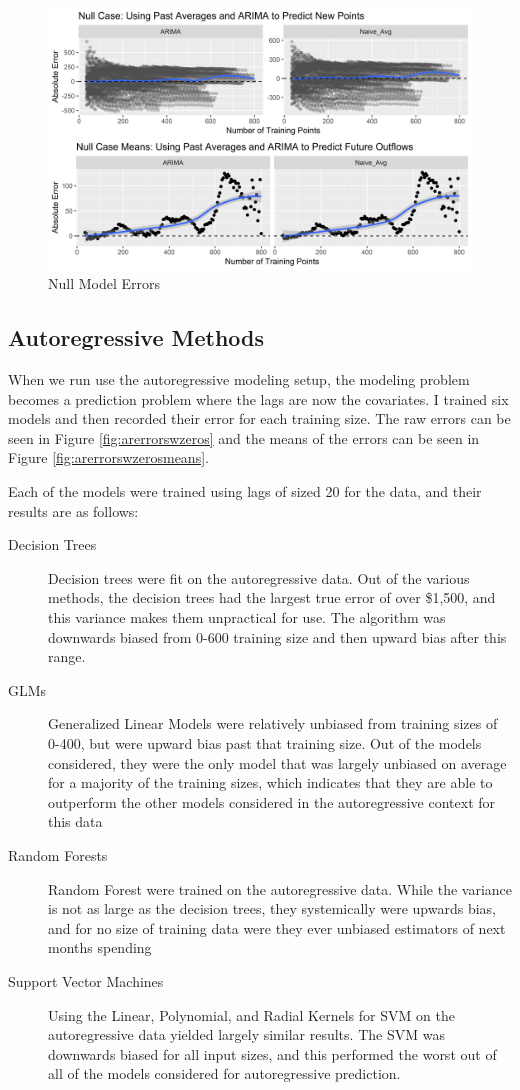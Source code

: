 \documentclass[11pt,a4paper]{article}
\begin{document}
\begin{figure}
	\centering
	\includegraphics[width=1\linewidth]{../figures/08_null_errors}
	\caption{Null Model Errors}
	\label{fig:08nullerrors}
\end{figure}
	
\subsection{Autoregressive Methods}

When we run use the autoregressive modeling setup, the modeling problem becomes a prediction problem where the lags are now the covariates. I trained six models and then recorded their error for each training size. The raw errors can be seen in Figure \ref{fig:arerrorswzeros} and the means of the errors can be seen in Figure \ref{fig:arerrorswzerosmeans}.

Each of the models were trained using lags of sized 20 for the data, and their results are as follows:
\begin{description}
	\item[Decision Trees] Decision trees were fit on the autoregressive data. Out of the various methods, the decision trees had the largest true error of over \$1,500, and this variance makes them unpractical for use. The algorithm was downwards biased from 0-600 training size and then upward bias after this range. 
	\item[GLMs] Generalized Linear Models were relatively unbiased from training sizes of 0-400, but were upward bias past that training size. Out of the models considered, they were the only model that was largely unbiased on average for a majority of the training sizes, which indicates that they are able to outperform the other models considered in the autoregressive context for this data
	\item[Random Forests] Random Forest were trained on the autoregressive data. While the variance is not as large as the decision trees, they systemically were upwards bias, and for no size of training data were they ever unbiased estimators of next months spending
	\item[Support Vector Machines] Using the Linear, Polynomial, and Radial Kernels for SVM on the autoregressive data yielded largely similar results. The SVM was downwards biased for all input sizes, and this performed the worst out of all of the models considered for autoregressive prediction. 
\end{description}
\end{document}
